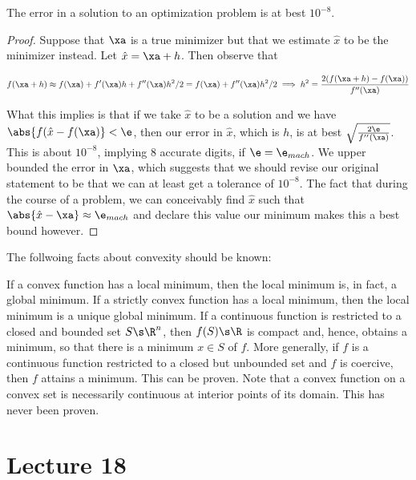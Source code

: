 \documentclass[../main.tex]{subfiles}
\begin{document}
\begin{proposition}
    The error in a solution to an optimization problem is at best $10^{-8}$.
\end{proposition}

\begin{proof}
    Suppose that $\xa$ is a true minimizer but that we estimate $\hat{x}$ to be the minimizer instead. Let $\hat{x} = \xa + h$. Then observe that

    \[
    f(\xa + h) \approx f(\xa) + f'(\xa)h + f''(\xa)h^2/2 = f(\xa) + f''(\xa)h^2/2 \implies h^2 = \frac{2(f(\xa + h) - f(\xa))}{f''(\xa)}
    \]

    What this implies is that if we take $\hat{x}$ to be a solution and we have $\abs{f(\hat{x} - f(\xa)} < \e$, then our error in $\hat{x}$, which is $h$, is at best $\sqrt{\frac{2\e}{f''(\xa)}}$. This is about $10^{-8}$, implying $8$ accurate digits, if $\e = \e_{mach}$. We upper bounded the error in $\xa$, which suggests that we should revise our original statement to be that we can at least get a tolerance of $10^{-8}$. The fact that during the course of a problem, we can conceivably find $\hat{x}$ such that $\abs{\hat{x} - \xa} \approx \e_{mach}$ and declare this value our minimum makes this a best bound however.
\end{proof}

\begin{remark}
    The follwoing facts about convexity should be known:

    \begin{outline}
        \1 If a convex function has a local minimum, then the local minimum is, in fact, a global minimum.
        \1 If a strictly convex function has a local minimum, then the local minimum is a unique global minimum.
        \1 If a continuous function is restricted to a closed and bounded set $S \s \R^n$, then $f(S) \s \R$ is compact and, hence, obtains a minimum, so that there is a minimum $x \in S$ of $f$.
        \1 More generally, if $f$ is a continuous function restricted to a closed but unbounded set and $f$ is coercive, then $f$ attains a minimum. This can be proven. Note that a convex function on a convex set is necessarily continuous at interior points of its domain. This has never been proven.
    \end{outline}
\end{remark}
\section{Lecture 18}
\end{document}
